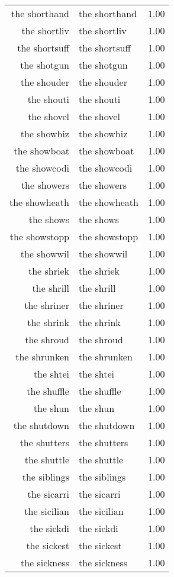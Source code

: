 \begin{table}[ht]
\begin{tabular}{rlr}
  the shorthand & the shorthand & 1.00 \\ 
  the shortliv & the shortliv & 1.00 \\ 
  the shortsuff & the shortsuff & 1.00 \\ 
  the shotgun & the shotgun & 1.00 \\ 
  the shouder & the shouder & 1.00 \\ 
  the shouti & the shouti & 1.00 \\ 
  the shovel & the shovel & 1.00 \\ 
  the showbiz & the showbiz & 1.00 \\ 
  the showboat & the showboat & 1.00 \\ 
  the showcodi & the showcodi & 1.00 \\ 
  the showers & the showers & 1.00 \\ 
  the showheath & the showheath & 1.00 \\ 
  the shows & the shows & 1.00 \\ 
  the showstopp & the showstopp & 1.00 \\ 
  the showwil & the showwil & 1.00 \\ 
  the shriek & the shriek & 1.00 \\ 
  the shrill & the shrill & 1.00 \\ 
  the shriner & the shriner & 1.00 \\ 
  the shrink & the shrink & 1.00 \\ 
  the shroud & the shroud & 1.00 \\ 
  the shrunken & the shrunken & 1.00 \\ 
  the shtei & the shtei & 1.00 \\ 
  the shuffle & the shuffle & 1.00 \\ 
  the shun & the shun & 1.00 \\ 
  the shutdown & the shutdown & 1.00 \\ 
  the shutters & the shutters & 1.00 \\ 
  the shuttle & the shuttle & 1.00 \\ 
  the siblings & the siblings & 1.00 \\ 
  the sicarri & the sicarri & 1.00 \\ 
  the sicilian & the sicilian & 1.00 \\ 
  the sickdi & the sickdi & 1.00 \\ 
  the sickest & the sickest & 1.00 \\ 
  the sickness & the sickness & 1.00 \\ 

\end{tabular}
\end{table}
